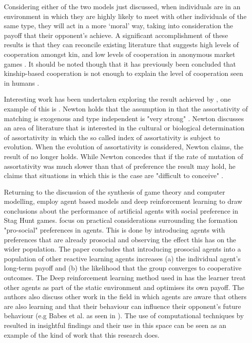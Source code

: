 \documentclass[11pt]{book}
\newcommand*{\np}{\par\noindent\newline}
\begin{document}
\np Considering either of the two models just discussed, when individuals are in an environment in which they are highly likely
to meet with other individuals of the same type, they will act in a more `moral' way, taking into consideration the
payoff that their opponent's achieve. A significant accomplishment of these results is that they can reconcile existing
literature that suggests high levels of cooperation amongst kin, and low levels of cooperation in anonymous market games \citep[See ][~p. 2296]{alger_homo_2013}. 
It should be noted though that it has previously been concluded that kinship-based cooperation is not enough to explain the level of cooperation seen in humans \citep{van_veelen_why_2006}. 

\np Interesting work has been undertaken exploring the result achieved by \citet{alger_homo_2013}, one example of this
is \citet{newton_preferences_2017}. Newton holds that the assumption in \citet{alger_homo_2013} that the assortativity
of matching is exogenous and type independent is "very strong" \citep{newton_preferences_2017}. Newton discusses an area
of literature that is interested in the cultural or biological determination of assortativity in which the
so called index of assortativity is subject to evolution. When the evolution of assortativity is considered, Newton
claims, the result of \citet{alger_homo_2013} no longer holds. While Newton concedes that if the rate of mutation of
assortativity was much slower than that of preference the result may hold, he claims that situations in which this is
the case are "difficult to conceive" \citep{newton_preferences_2017}.

\np Returning to the discussion of the synthesis of game theory and computer modelling, \citet{peysakhovich_prosocial_2017} employ agent based models and deep reinforcement learning to draw conclusions about the performance of artificial agents with social preference in Stag Hunt games.
\citet{peysakhovich_prosocial_2017} focus on practical considerations surrounding the formation "pro-social" preferences in agents.
This is done by introducing agents with preferences that are already prosocial and observing the effect this has on the wider population.
The paper concludes that introducing prosocial agents into a population of other reactive learning agents increases 
(a) the individual agent's long-term payoff and 
(b) the likelihood that the group converges to cooperative outcomes. 
The Deep reinforcement learning method used in \citet{peysakhovich_prosocial_2017} has the learner treat other agents as part of the static environment and optimises its own payoff. The authors also discuss other work in the field in which agents are aware that others are also learning and that their behaviour can influence their opponent's future behaviour (e.g Babes et al. as seen in \citealt{peysakhovich_prosocial_2017}).
The use of computational techniques by \citet{peysakhovich_prosocial_2017} resulted in insightful findings and their use in this space can be seen as an example of the kind of work that this research does.
\end{document}
